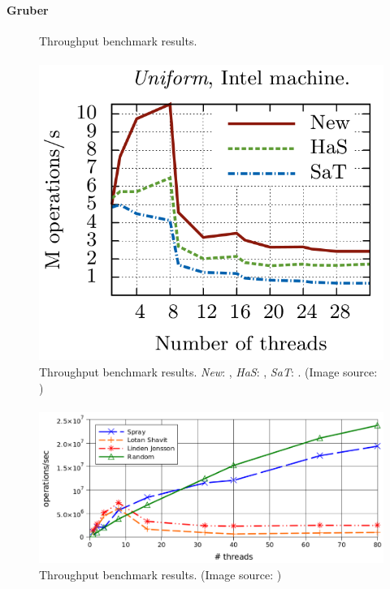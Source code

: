 \documentclass[usenames,dvipsnames]{beamer}
\begin{document}
\begin{frame}{}
\framesubtitle{Gruber}

\begin{figure}
\caption{Throughput benchmark results.}
\end{figure}
\end{frame}

\begin{frame}{}
\framesubtitle{\citeauthor{linden2013skiplist}}

\begin{figure}
\includegraphics[width=0.6 \textwidth]{results_linden}
\caption{Throughput benchmark results.
\emph{New}: \citeauthor{linden2013skiplist},
\emph{HaS}: \citeauthor{shavit2000skiplist},
\emph{SaT}: \citeauthor{sundell2003fast}. 
(Image source: \cite{linden2013skiplist})}
\end{figure}
\end{frame}

\begin{frame}{}
\framesubtitle{\citeauthor{alistarhspraylist}}

\begin{figure}
\includegraphics[width=\textwidth]{results_spraylist}
\caption{Throughput benchmark results. 
(Image source: \cite{alistarhspraylist})}
\end{figure}
\end{frame}
\end{document}
